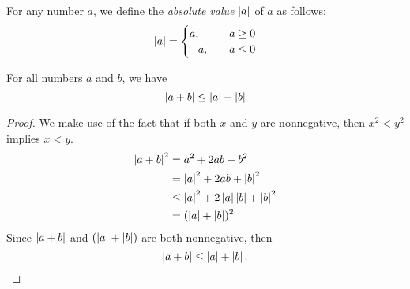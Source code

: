 \begin{defi} For any number $a$, we define the \emph{absolute
value} $\left\lvert a\right\rvert$ of $a$ as follows:
\[
    \abs{a} = 
    \begin{cases}
         a, \hfill &\quad  a \geq 0 \\
         -a, \hfill &\quad a \leq 0 
    \end{cases}
\]
\end{defi}
\begin{thm}
     For all numbers $a$ and $b$, we have
     \begin{equation*}
         \left\lvert a+b\right\rvert \leq \left\lvert a\right\rvert+\left\lvert b\right\rvert
     \end{equation*}
\end{thm}
\begin{proof} We make use of the fact that if both $x$ and $y$ are nonnegative,
then $x^2 < y^2$ implies $x < y$.
      \begin{align*}
          \left\lvert a+b\right\rvert^2 &= a^2+2ab+b^2 \\
          &= \left\lvert a\right\rvert^2+2ab+\left\lvert b\right\rvert^2 \\
          &\leq \left\lvert a\right\rvert^2+2\left\lvert a\right\rvert\left\lvert b\right\rvert+\left\lvert b\right\rvert^2 \\
          &=(\left\lvert a\right\rvert+\left\lvert b\right\rvert)^2 
      \end{align*}
      Since $\left\lvert a+b\right\rvert$ and $(\left\lvert a\right\rvert+\left\lvert b\right\rvert)$ are both nonnegative, then
      \begin{equation*}
          \left\lvert a+b\right\rvert \leq \left\lvert a\right\rvert+\left\lvert b\right\rvert.
      \end{equation*}
\end{proof}

